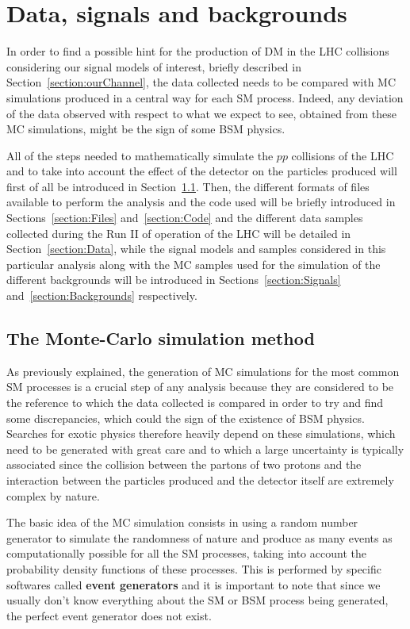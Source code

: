 \documentclass[a4paper, 10pt, openright]{report}
\begin{document}
\chapter{Data, signals and backgrounds} \label{chapter:Samples}

In order to find a possible hint for the production of \ac{DM} in the \ac{LHC} collisions considering our signal models of interest, briefly described in Section~\ref{section:ourChannel}, the data collected needs to be compared with \acf{MC} simulations produced in a central way for each \ac{SM} process. Indeed, any deviation of the data observed with respect to what we expect to see, obtained from these \ac{MC} simulations, might be the sign of some \ac{BSM} physics. 

All of the steps needed to mathematically simulate the $pp$ collisions of the \ac{LHC} and to take into account the effect of the detector on the particles produced will first of all be introduced in Section~\ref{section:MC}. Then, the different formats of files available to perform the analysis and the code used will be briefly introduced in Sections~\ref{section:Files} and~\ref{section:Code} and the different data samples collected during the Run II of operation of the \ac{LHC} will be detailed in Section~\ref{section:Data}, while the signal models and samples considered in this particular analysis along with the \ac{MC} samples used for the simulation of the different backgrounds will be introduced in Sections~\ref{section:Signals} and~\ref{section:Backgrounds} respectively.

\section{The Monte-Carlo simulation method} \label{section:MC}

As previously explained, the generation of \ac{MC} simulations for the most common \ac{SM} processes is a crucial step of any analysis because they are considered to be the reference to which the data collected is compared in order to try and find some discrepancies, which could the sign of the existence of \ac{BSM} physics. Searches for exotic physics therefore heavily depend on these simulations, which need to be generated with great care and to which a large uncertainty is typically associated since the collision between the partons of two protons and the interaction between the particles produced and the detector itself are extremely complex by nature. 

The basic idea of the \ac{MC} simulation consists in using a random number generator to simulate the randomness of nature and produce as many events as computationally possible for all the \ac{SM} processes, taking into account the probability density functions of these processes. This is performed by specific softwares called \textbf{event generators} and it is important to note that since we usually don't know everything about the \ac{SM} or \ac{BSM} process being generated, the perfect event generator does not exist.
\end{document}

